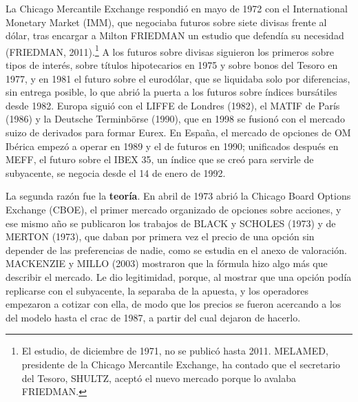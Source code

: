 \documentclass[10pt,a4paper]{article}
\newcounter{anexo}
\begin{document}
La Chicago Mercantile Exchange respondió en mayo de 1972 con el International Monetary Market (IMM), que negociaba futuros sobre siete divisas frente al dólar, tras encargar a Milton FRIEDMAN un estudio que defendía su necesidad (FRIEDMAN, 2011).\footnote{%
    El estudio, de diciembre de 1971, no se publicó hasta 2011. MELAMED, presidente de la Chicago Mercantile Exchange, ha contado que el secretario del Tesoro, SHULTZ, aceptó el nuevo mercado porque lo avalaba FRIEDMAN.
} A los futuros sobre divisas siguieron los primeros sobre tipos de interés, sobre títulos hipotecarios en 1975 y sobre bonos del Tesoro en 1977, y en 1981 el futuro sobre el eurodólar, que se liquidaba solo por diferencias, sin entrega posible, lo que abrió la puerta a los futuros sobre índices bursátiles desde 1982. Europa siguió con el LIFFE de Londres (1982), el MATIF de París (1986) y la Deutsche Terminbörse (1990), que en 1998 se fusionó con el mercado suizo de derivados para formar Eurex. En España, el mercado de opciones de OM Ibérica empezó a operar en 1989 y el de futuros en 1990; unificados después en MEFF, el futuro sobre el IBEX 35, un índice que se creó para servirle de subyacente, se negocia desde el 14 de enero de 1992.

La segunda razón fue la \textbf{teoría}. En abril de 1973 abrió la Chicago Board Options Exchange (CBOE), el primer mercado organizado de opciones sobre acciones, y ese mismo año se publicaron los trabajos de BLACK y SCHOLES (1973) y de MERTON (1973), que daban por primera vez el precio de una opción sin depender de las preferencias de nadie, como se estudia en el anexo de valoración. MACKENZIE y MILLO (2003) mostraron que la fórmula hizo algo más que describir el mercado. Le dio legitimidad, porque, al mostrar que una opción podía replicarse con el subyacente, la separaba de la apuesta, y los operadores empezaron a cotizar con ella, de modo que los precios se fueron acercando a los del modelo hasta el crac de 1987, a partir del cual dejaron de hacerlo.
\end{document}
